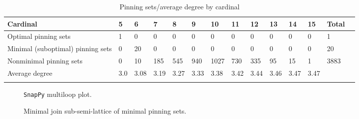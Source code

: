 \documentclass{article}%
\begin{document}
\begin{table}[ht]
	\caption{Pinning sets/average degree by cardinal}
	\centering
	\renewcommand{\arraystretch}{1.5}
	\begin{tabularx}{\textwidth}{lXXXXXXXXXXXXX}
		\toprule
			Cardinal & 5 & 6 & 7 & 8 & 9 & 10 & 11 & 12 & 13 & 14 & 15 & Total\\
			\hline
			Optimal pinning sets & 1 & 0 & 0 & 0 & 0 & 0 & 0 & 0 & 0 & 0 & 0 & 1 \\
			Minimal (suboptimal) pinning sets & 0 & 20 & 0 & 0 & 0 & 0 & 0 & 0 & 0 & 0 & 0 & 20 \\
			Nonminimal pinning sets & 0 & 10 & 185 & 545 & 940 & 1027 & 730 & 335 & 95 & 15 & 1 & 3883 \\
			Average degree & 3.0 & 3.08 & 3.19 & 3.27 & 3.33 & 3.38 & 3.42 & 3.44 & 3.46 & 3.47 & 3.47 &  \\
		\bottomrule \\ 
	\end{tabularx}
\end{table}

\begin{multicols}{2}
\begin{figure}[H]
\centering

\caption{\texttt{SnapPy} multiloop plot.}
\label{fig:tex/img/[[10, 14, 1, 11], [11, 15, 12, 22], [9, 17, 10, 18], [13, 16, 14, 17], [1, 16, 2, 15], [12, 2, 13, 3], [21, 26, 22, 23], [18, 5, 19, 4], [8, 3, 9, 4], [23, 8, 24, 7], [20, 6, 21, 7], [25, 5, 26, 6], [.svg}
\end{figure}
\columnbreak

\begin{figure}[H]
\centering
\scalebox{0.8}{}
\caption{Minimal join sub-semi-lattice of minimal pinning sets.}
\label{fig:tex/img/[[10, 14, 1, 11], [11, 15, 12, 22], [9, 17, 10, 18], [13, 16, 14, 17], [1, 16, 2, 15], [12, 2, 13, 3], [21, 26, 22, 23], [18, 5, 19, 4], [8, 3, 9, 4], [23, 8, 24, 7], [20, 6, 21, 7], [25, 5, 26, 6], [.pgf}
\end{figure}
\end{multicols}
\end{document}
